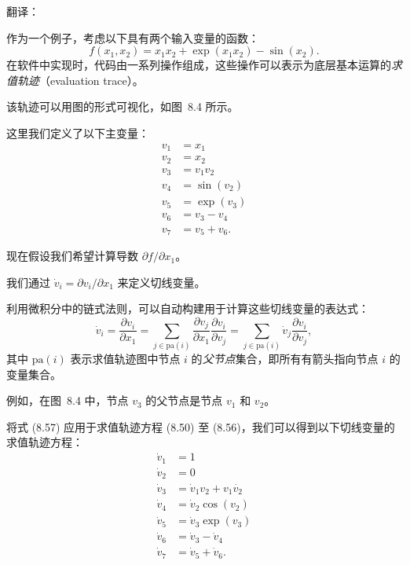 \documentclass{article}
\begin{document}

{\color{red}
翻译：%

作为一个例子，考虑以下具有两个输入变量的函数：
\begin{equation}
f(x_1, x_2) = x_1 x_2 + \exp(x_1 x_2) - \sin(x_2).
\tag{8.49}
\end{equation}
在软件中实现时，代码由一系列操作组成，这些操作可以表示为底层基本运算的\emph{求值轨迹}（evaluation trace）。

该轨迹可以用图的形式可视化，如图~8.4 所示。

这里我们定义了以下主变量：
\begin{align}
v_1 &= x_1 \tag{8.50} \\
v_2 &= x_2 \tag{8.51} \\
v_3 &= v_1 v_2 \tag{8.52} \\
v_4 &= \sin(v_2) \tag{8.53} \\
v_5 &= \exp(v_3) \tag{8.54} \\
v_6 &= v_3 - v_4 \tag{8.55} \\
v_7 &= v_5 + v_6. 
\tag{8.56}
\end{align}

现在假设我们希望计算导数 $\partial f / \partial x_1$。

我们通过 $\dot{v}_i = \partial v_i / \partial x_1$ 来定义切线变量。

利用微积分中的链式法则，可以自动构建用于计算这些切线变量的表达式：
\begin{equation}
\dot{v}_i = \frac{\partial v_i}{\partial x_1} 
= \sum_{j \in \mathrm{pa}(i)} \frac{\partial v_j}{\partial x_1} \frac{\partial v_i}{\partial v_j}
= \sum_{j \in \mathrm{pa}(i)} \dot{v}_j \frac{\partial v_i}{\partial v_j},
\tag{8.57}
\end{equation}
其中 $\mathrm{pa}(i)$ 表示求值轨迹图中节点 $i$ 的\emph{父节点}集合，即所有有箭头指向节点 $i$ 的变量集合。

例如，在图~8.4 中，节点 $v_3$ 的父节点是节点 $v_1$ 和 $v_2$。

将式 (8.57) 应用于求值轨迹方程 (8.50) 至 (8.56)，我们可以得到以下切线变量的求值轨迹方程：
\begin{align}
\dot{v}_1 &= 1 \tag{8.58} \\
\dot{v}_2 &= 0 \tag{8.59} \\
\dot{v}_3 &= \dot{v}_1 v_2 + v_1 \dot{v_2} \tag{8.60} \\
\dot{v}_4 &= \dot{v}_2 \cos(v_2) \tag{8.61} \\
\dot{v}_5 &= \dot{v}_3 \exp(v_3) \tag{8.62} \\
\dot{v}_6 &= \dot{v}_3 - \dot{v}_4 \tag{8.63} \\
\dot{v}_7 &= \dot{v}_5 + \dot{v}_6. 
\tag{8.64}
\end{align}

}
\end{document}
